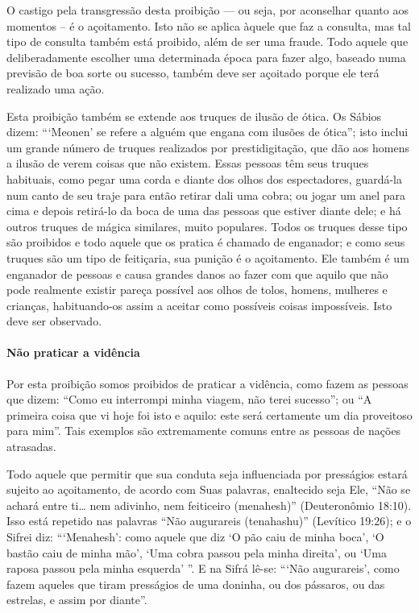 O castigo pela transgressão desta proibição --- ou seja, por aconselhar
quanto aos momentos -- é o açoitamento. Isto não se aplica àquele que
faz a consulta, mas tal tipo de consulta também está proibido, além de
ser uma fraude. Todo aquele que deliberadamente escolher uma determinada
época para fazer algo, baseado numa previsão de boa sorte ou sucesso,
também deve ser açoitado porque ele terá realizado uma ação.

Esta proibição também se extende aos truques de ilusão de ótica. Os
Sábios dizem: ```Meonen' se refere a alguém que engana com ilusões de
ótica''; isto inclui um grande número de truques realizados por
prestidigitação, que dão aos homens a ilusão de verem coisas que não
existem. Essas pessoas têm seus truques habituais, como pegar uma corda
e diante dos olhos dos espectadores, guardá-la num canto de seu traje
para então retirar dali uma cobra; ou jogar um anel para cima e depois
retirá-lo da boca de uma das pessoas que estiver diante dele; e há
outros truques de mágica similares, muito populares. Todos os truques
desse tipo são proibidos e todo aquele que os pratica é chamado de
enganador; e como seus truques são um tipo de feitiçaria, sua punição é
o açoitamento. Ele também é um enganador de pessoas e causa grandes
danos ao fazer com que aquilo que não pode realmente existir pareça
possível aos olhos de tolos, homens, mulheres e crianças, habituando-os assim a
aceitar como possíveis coisas impossíveis. Isto deve ser observado.

\paragraph{Não praticar a vidência}

Por esta proibição somos proibidos de praticar a vidência, como fazem
as pessoas que dizem: ``Como eu interrompi minha viagem, não terei
sucesso''; ou ``A primeira coisa que vi hoje foi isto e aquilo: este
será certamente um dia proveitoso para mim''. Tais exemplos são
extremamente comuns entre as pessoas de nações atrasadas.

Todo aquele que permitir que sua conduta seja influenciada por
presságios estará sujeito ao açoitamento, de acordo com Suas palavras,
enaltecido seja Ele, ``Não se achará entre ti\ldots{} nem adivinho, nem
feiticeiro (menahesh)'' (Deuteronômio 18:10). Isso está repetido nas
palavras ``Não augurareis (tenahashu)'' (Levítico 19:26); e o Sifrei
diz: ```Menahesh': como aquele que diz `O pão caiu de minha boca', `O
bastão caiu de minha mão', `Uma cobra passou pela minha direita', ou
`Uma raposa passou pela minha esquerda' ''. E na Sifrá lê-se: ```Não
augurareis', como fazem aqueles que tiram presságios de uma doninha, ou
dos pássaros, ou das estrelas, e assim por diante''.

